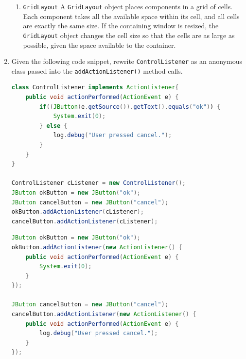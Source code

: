 \documentclass[11pt]{article}
\newenvironment{answer}{\large\lstset{basicstyle=\tiny\ttfamily}\color{white} }{}
\newenvironment{answer}{\large\lstset{basicstyle=\large\ttfamily}\color{red} }{}
\begin{document}
\begin{enumerate}
\begin{enumerate}
\item \texttt{GridLayout}
\begin{answer}
A \texttt{GridLayout} object places components in a grid of cells. Each component takes all the available space within its cell, and all cells are exactly the same size. If the containing window is resized, the \texttt{GridLayout} object changes the cell size so that the cells are as large as possible, given the space available to the container.\end{answer}
\end{enumerate}


\vspace{24pt}
\item Given the following code snippet, rewrite \texttt{ControlListener} as an anonymous class passed into the \texttt{addActionListener()} method calls.
\begin{lstlisting}[language=java]
class ControlListener implements ActionListener{
	public void actionPerformed(ActionEvent e) {
		if((JButton)e.getSource()).getText().equals("ok")) {
			System.exit(0);
		} else {
			log.debug("User pressed cancel.");
		}
	}
}

ControlListener cListener = new ControlListener();
JButton okButton = new JButton("ok");
JButton cancelButton = new JButton("cancel");
okButton.addActionListener(cListener);
cancelButton.addActionListener(cListener);
\end{lstlisting}
\begin{answer}
\begin{lstlisting}[language=java]
JButton okButton = new JButton("ok");
okButton.addActionListener(new ActionListener() {
	public void actionPerformed(ActionEvent e) {
		System.exit(0);
	}
});

JButton cancelButton = new JButton("cancel");
cancelButton.addActionListener(new ActionListener() {
	public void actionPerformed(ActionEvent e) {
		log.debug("User pressed cancel.");
	}
});
\end{lstlisting}
\end{answer}



\end{enumerate}
\end{document}
